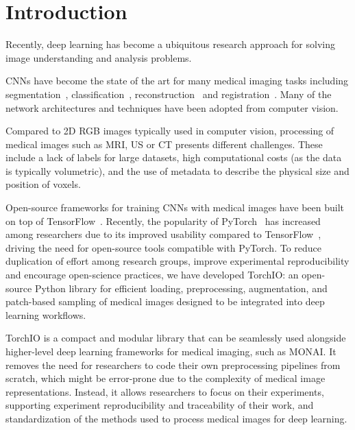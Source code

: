\section{Introduction}

Recently, deep learning has become a ubiquitous research approach for solving image understanding and analysis problems.

\Acp{CNN} have become the state of the art for many medical imaging tasks including segmentation~\cite{cicek_3d_2016}, classification~\cite{lu_multimodal_2018}, reconstruction~\cite{chen_variable-density_2018} and registration~\cite{shan_unsupervised_2018}.
Many of the network architectures and techniques have been adopted from computer vision.

Compared to 2D \ac{RGB} images typically used in computer vision, processing of medical images such as \ac{MRI}, \ac{US} or \ac{CT} presents different challenges.
These include a lack of labels for large datasets, high computational costs (as the data is typically volumetric), and the use of metadata to describe the physical size and position of voxels.

Open-source frameworks for training \acp{CNN} with medical images have been built on top of TensorFlow~\cite{abadi_tensorflow_2016,pawlowski_dltk_2017,gibson_niftynet_2018}.
Recently, the popularity of PyTorch~\cite{paszke_pytorch_2019} has increased among researchers due to its improved usability compared to TensorFlow~\cite{he_state_2019}, driving the need for open-source tools compatible with PyTorch.
To reduce duplication of effort among research groups, improve experimental reproducibility and encourage open-science practices, we have developed TorchIO: an open-source Python library for efficient loading, preprocessing, augmentation, and patch-based sampling of medical images designed to be integrated into deep learning workflows.

TorchIO is a compact and modular library that can be seamlessly used alongside higher-level deep learning frameworks for medical imaging, such as \ac{MONAI}.
It removes the need for researchers to code their own preprocessing pipelines from scratch, which might be error-prone due to the complexity of medical image representations.
Instead, it allows researchers to focus on their experiments, supporting experiment reproducibility and traceability of their work, and standardization of the methods used to process medical images for deep learning.
